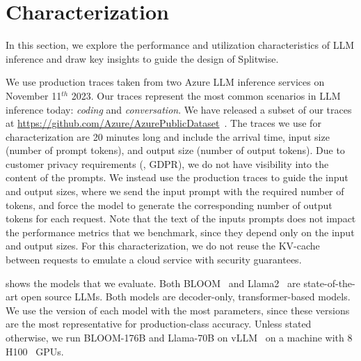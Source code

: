 \section{Characterization}
\label{sec:motivation}
In this section, we explore the performance and utilization characteristics of LLM inference and draw key insights to guide the design of Splitwise. 

We use production traces taken from two Azure LLM inference services on November 11$^{th}$ 2023. 
Our traces represent the most common scenarios in LLM inference today:
\emph{coding} and \emph{conversation}.
We have released a subset of our traces at \url{https://github.com/Azure/AzurePublicDataset}~\cite{azure_llm_trace}.
The traces we use for characterization are 20 minutes long and include the arrival time, input size (number of prompt tokens), and output size (number of output tokens).
Due to customer privacy requirements (\eg, GDPR), we do not have visibility into the content of the prompts.
We instead use the production traces to guide the input and output sizes, where we send the input prompt with the required number of tokens, 
and force the model to generate the corresponding number of output tokens for each request.
Note that the text of the inputs prompts does not impact the performance metrics that we benchmark, since they depend only on the input and output sizes.
For this characterization, we do not reuse the KV-cache between requests to emulate a cloud service with security guarantees.


 shows the models that we evaluate.
Both BLOOM~\cite{scao2022bloom} and Llama2~\cite{hf_llama2} are state-of-the-art open source LLMs.
Both models are decoder-only, transformer-based models. 
We use the version of each model with the most parameters, since these versions are the most representative for production-class accuracy.
Unless stated otherwise, we run BLOOM-176B and Llama-70B on vLLM~\cite{vllm} on a machine with 8 H100~\cite{dgxh100} GPUs.

